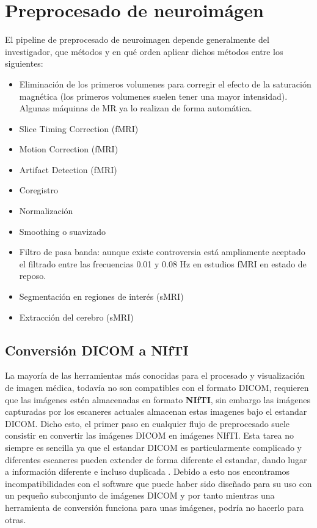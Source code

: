 \section{Preprocesado de neuroimágen}

El pipeline de preprocesado de neuroimagen depende generalmente del investigador, que métodos y en qué orden aplicar dichos métodos entre los siguientes:

\begin{itemize}
	\item Eliminación de los primeros volumenes para corregir el efecto de la saturación magnética (los primeros volumenes suelen tener una mayor intensidad). Algunas máquinas de MR ya lo realizan de forma automática.
	\item Slice Timing Correction (fMRI)
	\item Motion Correction (fMRI)
	\item Artifact Detection (fMRI)
	\item Coregistro
	\item Normalización
	\item Smoothing o suavizado
	\item Filtro de pasa banda: aunque existe controversia está ampliamente aceptado el filtrado entre las frecuencias 0.01 y 0.08 Hz en estudios fMRI en estado de reposo.\cite{brainhack}
	\item Segmentación en regiones de interés (sMRI) 
	\item Extracción del cerebro (sMRI)
\end{itemize}

\subsection{Conversión DICOM a NIfTI}

La mayoría de las herramientas más conocidas para el procesado y visualización de imagen médica, todavía no son compatibles con el formato DICOM, requieren que las imágenes estén almacenadas en formato \textbf{NIfTI}, sin embargo las imágenes capturadas por los escaneres actuales almacenan estas imagenes bajo el estandar DICOM.
Dicho esto, el primer paso en cualquier flujo de preprocesado suele consistir en convertir las imágenes DICOM en imágenes NIfTI. Esta tarea no siempre es sencilla ya que el estandar DICOM es particularmente complicado y diferentes escaneres pueden extender de forma diferente el estandar, dando lugar a información diferente e incluso duplicada \cite{dcm2nifti}. Debido a esto nos encontramos incompatibilidades con el software que puede haber sido diseñado para su uso con un pequeño subconjunto de imágenes DICOM y por tanto mientras una herramienta de conversión funciona para unas imágenes, podría no hacerlo para otras.


